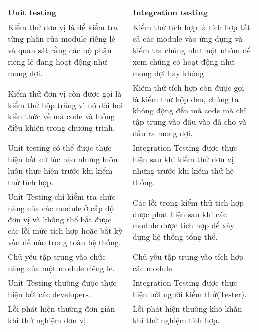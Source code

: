 \begin{table}[H]
	\centering
	\begin{tabular}{|p{8cm}|p{8cm}|}
		\hline
		\textbf{Unit testing}                                                                                                                                     & \textbf{Integration testing}                                                                                                                 \\ \hline
		Kiểm thử đơn vị là để kiểm tra từng phần của module riêng lẻ và quan sát rằng các bộ phận riêng lẻ đang hoạt động như mong đợi.                           & Kiểm thử tích hợp là tích hợp tất cả các module vào ứng dụng và kiểm tra chúng như một nhóm để xem chúng có hoạt động như mong đợi hay không \\ \hline
		Kiểm thử đơn vị còn được gọi là kiểm thử hộp trắng vì nó đòi hỏi kiến thức về mã code và luồng điều khiển trong chương trình.                             & Kiểm thử tích hợp còn được gọi là kiểm thử hộp đen, chúng ta không động đến mã code mà chỉ tập trung vào đầu vào đã cho và đầu ra mong đợi.  \\ \hline
		Unit testing có thể được thực hiện bất cứ lúc nào nhưng luôn luôn thực hiện trước khi kiểm thử tích hợp.                                                  & Integration Testing được thực hiện sau khi kiểm thử đơn vị nhưng trước khi kiểm thử hệ thống.                                                \\ \hline
		Unit Testing chỉ kiểm tra chức năng của các module ở cấp độ đơn vị và không thể bắt được các lỗi mức tích hợp hoặc bất kỳ vấn đề nào trong toàn hệ thống. & Các lỗi trong kiểm thử tích hợp được phát hiện sau khi các module được tích hợp để xây dựng hệ thống tổng thể.                               \\ \hline
		Chủ yếu tập trung vào chức năng của một module riêng lẻ.                                                                                                  & Chủ yếu tập trung vào tích hợp các module.                                                                                                   \\ \hline
		Unit Testing thường được thực hiện bởi các developers.                                                                                                    & Integration Testing được thực hiện bởi người kiểm thử(Tester).                                                                               \\ \hline
		Lỗi phát hiện thường đơn giản khi thử nghiệm đơn vị.                                                                                                      & Lỗi phát hiện thường khó khăn khi thử nghiệm tích hợp.                                                                                       \\ \hline

\end{tabular}
\end{table}
